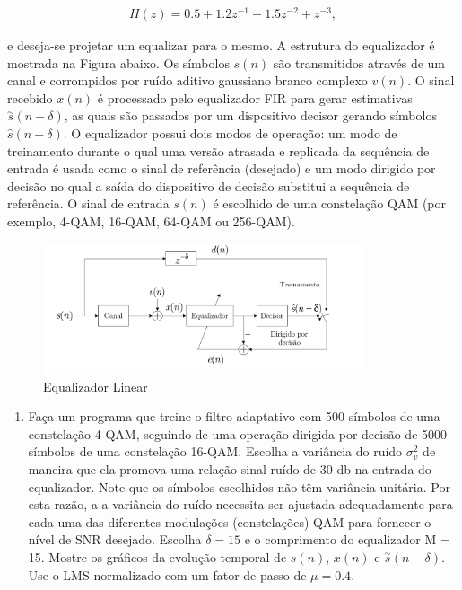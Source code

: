 \documentclass[a4paper,10pt]{article}
\begin{document}
\begin{enumerate}
				\begin{align}
					H(z) = 0.5 + 1.2z^{-1} + 1.5z^{-2} + z^{-3},
				\end{align}
				
				e deseja-se projetar um equalizar para o mesmo. A estrutura do equalizador é mostrada na Figura abaixo. Os símbolos $s(n)$ são transmitidos através de um canal e corrompidos por ruído aditivo gaussiano branco complexo $v(n)$. O sinal recebido $x(n)$ é processado pelo equalizador FIR para gerar estimativas $\overset{\sim}{s}(n - \delta)$, as quais são passados por um dispositivo decisor gerando  símbolos $\hat{s}(n - \delta)$. O equalizador possui dois modos de operação: um modo de treinamento durante o qual uma versão atrasada e  replicada da sequência de entrada é usada como o sinal de referência (desejado) e um modo dirigido por decisão no qual a saída do dispositivo de decisão substitui a sequência de referência. O sinal de entrada $s(n)$ é escolhido de uma constelação QAM (por exemplo, 4-QAM, 16-QAM, 64-QAM ou 256-QAM).
				
				\begin{figure}[!ht]
					\centering
					\includegraphics[width=0.85\textwidth]{figs/equalizador_linear.png}
					\caption{Equalizador Linear}
				\end{figure}
			
				\begin{enumerate}
					
					\item Faça um programa que treine o ﬁltro adaptativo com 500 símbolos de uma constelação 4-QAM, seguindo de uma operação dirigida por decisão de 5000 símbolos de uma constelação 16-QAM. Escolha a variância do ruído $\sigma^{2}_{v}$ de maneira que ela promova uma relação sinal ruído de 30 db na entrada do equalizador. Note que os símbolos escolhidos não têm variância unitária. Por esta razão, a a variância do ruído necessita ser ajustada adequadamente para cada uma das diferentes modulações (constelações) QAM para fornecer o nível de SNR desejado. Escolha $\delta = 15$ e o comprimento do equalizador M = 15. Mostre os gráﬁcos da evolução temporal de $s(n)$, $x(n)$ e $\overset{\sim}{s}(n - \delta)$. Use o LMS-normalizado com um fator de passo de $\mu = 0.4$.
								

\end{enumerate}
\end{enumerate}
\end{document}
